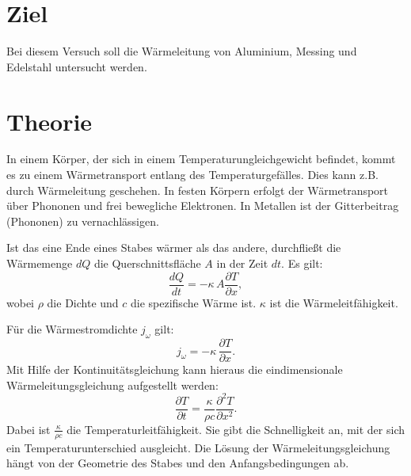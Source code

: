 \section{Ziel}
\label{sec:Ziel}

Bei diesem Versuch soll die Wärmeleitung von Aluminium, Messing und Edelstahl untersucht werden. 

\section{Theorie}
\label{sec:Theorie}

In einem Körper, der sich in einem Temperaturungleichgewicht befindet, kommt es zu einem Wärmetransport entlang 
des Temperaturgefälles. Dies kann z.B. durch Wärmeleitung geschehen. In festen Körpern erfolgt der Wärmetransport 
über Phononen und frei bewegliche Elektronen. In Metallen ist der Gitterbeitrag (Phononen) zu vernachlässigen. 

\noindent Ist das eine Ende eines Stabes wärmer als das andere, durchfließt die Wärmemenge $dQ$ die Querschnittsfläche $A$ in der Zeit $dt$. Es gilt:
\begin{equation}
\frac{dQ}{dt} = -\kappa \, A \frac{\partial T}{\partial x},
\label{eqn:dQ}
\end{equation}
wobei $\rho$ die Dichte und $c$ die spezifische Wärme ist.
$\kappa$ ist die Wärmeleitfähigkeit.

\noindent Für die Wärmestromdichte $j_{\omega}$ gilt:
\begin{equation*}
    j_{\omega} = -\kappa \, \frac{\partial T}{\partial x}.
\end{equation*}
Mit Hilfe der Kontinuitätsgleichung kann hieraus die eindimensionale Wärmeleitungsgleichung aufgestellt werden:
\begin{equation*}
    \frac{\partial T}{\partial t} = \frac{\kappa}{\rho c} \frac{\partial^2 T}{\partial x^2}.
\end{equation*}
Dabei ist $\frac{\kappa}{\rho c}$ die Temperaturleitfähigkeit. Sie gibt die Schnelligkeit an, mit der sich ein 
Temperaturunterschied ausgleicht. Die Lösung der Wärmeleitungsgleichung hängt von der Geometrie des Stabes und den Anfangsbedingungen ab. 

